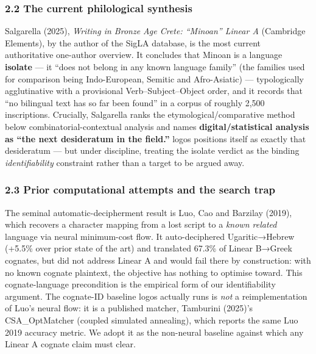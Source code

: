 \documentclass[
  10pt,
]{article}
\begin{document}
\hypertarget{the-current-philological-synthesis}{%
\subsubsection{2.2 The current philological
synthesis}\label{the-current-philological-synthesis}}

Salgarella (2025), \emph{Writing in Bronze Age Crete: ``Minoan'' Linear
A} (Cambridge Elements), by the author of the SigLA database, is the
most current authoritative one-author overview. It concludes that Minoan
is a language \textbf{isolate} --- it ``does not belong in any known
language family'' (the families used for comparison being Indo-European,
Semitic and Afro-Asiatic) --- typologically agglutinative with a
provisional Verb--Subject--Object order, and it records that ``no
bilingual text has so far been found'' in a corpus of roughly 2,500
inscriptions. Crucially, Salgarella ranks the etymological/comparative
method below combinatorial-contextual analysis and names
\textbf{digital/statistical analysis as ``the next desideratum in the
field.''} logos positions itself as exactly that desideratum --- but
under discipline, treating the isolate verdict as the binding
\emph{identifiability} constraint rather than a target to be argued
away.

\hypertarget{prior-computational-attempts-and-the-search-trap}{%
\subsubsection{2.3 Prior computational attempts and the search
trap}\label{prior-computational-attempts-and-the-search-trap}}

The seminal automatic-decipherment result is Luo, Cao and Barzilay
(2019), which recovers a character mapping from a lost script to a
\emph{known related} language via neural minimum-cost flow. It
auto-deciphered Ugaritic→Hebrew (+5.5\% over prior state of the art) and
translated 67.3\% of Linear B→Greek cognates, but did not address Linear
A and would fail there by construction: with no known cognate plaintext,
the objective has nothing to optimise toward. This cognate-language
precondition is the empirical form of our identifiability argument. The
cognate-ID baseline logos actually runs is \emph{not} a reimplementation
of Luo's neural flow: it is a published matcher, Tamburini (2025)'s
CSA\_OptMatcher (coupled simulated annealing), which reports the same
Luo 2019 accuracy metric. We adopt it as the non-neural baseline against
which any Linear A cognate claim must clear.
\end{document}
